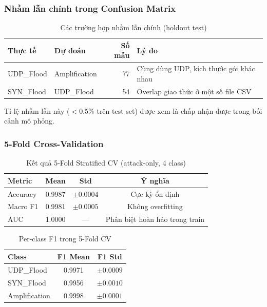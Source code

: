 \documentclass[12pt,a4paper]{article}
\begin{document}
\subsubsection{Nhầm lẫn chính trong Confusion Matrix}

\begin{table}[H]
\centering
\caption{Các trường hợp nhầm lẫn chính (holdout test)}
\label{tab:confusion}
\begin{tabular}{llrl}
\toprule
\textbf{Thực tế} & \textbf{Dự đoán} & \textbf{Số mẫu} & \textbf{Lý do} \\
\midrule
UDP\_Flood   & Amplification & 77 & Cùng dùng UDP, kích thước gói khác nhau \\
SYN\_Flood   & UDP\_Flood    & 54 & Overlap giao thức ở một số file CSV \\
\bottomrule
\end{tabular}
\end{table}

Tỉ lệ nhầm lẫn này ($<$0.5\% trên test set) được xem là chấp nhận được trong bối cảnh mô phỏng.

\subsubsection{5-Fold Cross-Validation}

\begin{table}[H]
\centering
\caption{Kết quả 5-Fold Stratified CV (attack-only, 4 class)}
\label{tab:xgb_cv}
\begin{tabular}{lccc}
\toprule
\textbf{Metric} & \textbf{Mean} & \textbf{Std} & \textbf{Ý nghĩa} \\
\midrule
Accuracy & 0.9987 & $\pm 0.0004$ & Cực kỳ ổn định \\
Macro F1 & 0.9981 & $\pm 0.0005$ & Không overfitting \\
AUC      & 1.0000 & --- & Phân biệt hoàn hảo trong train \\
\bottomrule
\end{tabular}
\end{table}

\begin{table}[H]
\centering
\caption{Per-class F1 trong 5-Fold CV}
\label{tab:xgb_cv_class}
\begin{tabular}{lcc}
\toprule
\textbf{Class} & \textbf{F1 Mean} & \textbf{F1 Std} \\
\midrule
UDP\_Flood   & 0.9971 & $\pm 0.0009$ \\
SYN\_Flood   & 0.9956 & $\pm 0.0010$ \\
Amplification & 0.9998 & $\pm 0.0001$ \\
\bottomrule
\end{tabular}
\end{table}
\end{document}
